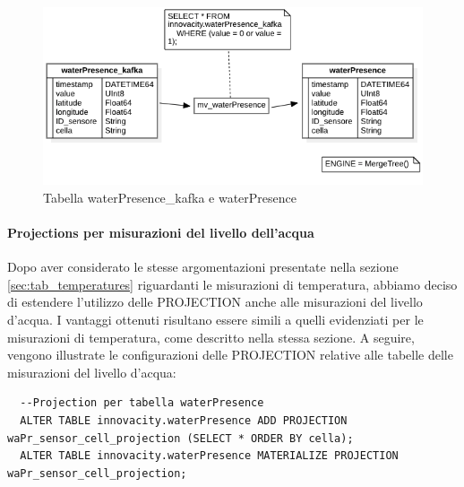 \begin{figure}[H]
  \centering
  \includegraphics[width=1\textwidth]{../Images/SpecificaTecnica/waterPresence.png}
  \caption{Tabella waterPresence\_kafka e waterPresence}
  \label{fig:umidities}
\end{figure}

\paragraph{Projections per misurazioni del livello dell'acqua} 
Dopo aver considerato le stesse argomentazioni presentate nella sezione \ref{sec:tab_temperatures} riguardanti le misurazioni di temperatura, abbiamo deciso di estendere l'utilizzo delle PROJECTION anche alle misurazioni del livello d'acqua. I vantaggi ottenuti risultano essere simili a quelli evidenziati per le misurazioni di temperatura, come descritto nella stessa sezione. A seguire, vengono illustrate le configurazioni delle PROJECTION relative alle tabelle delle misurazioni del livello d'acqua:
\begin{lstlisting}
  --Projection per tabella waterPresence
  ALTER TABLE innovacity.waterPresence ADD PROJECTION waPr_sensor_cell_projection (SELECT * ORDER BY cella);
  ALTER TABLE innovacity.waterPresence MATERIALIZE PROJECTION waPr_sensor_cell_projection;
\end{lstlisting}